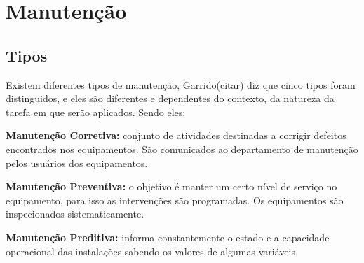 \chapter{Manutenção}
\label{cap-manutencao}

\section{Tipos}

Existem diferentes tipos de manutenção,  Garrido(citar) diz que  cinco tipos foram distinguidos, e eles são diferentes e dependentes do contexto, da natureza da tarefa em que serão aplicados. Sendo eles: 

\begin{enumarate}
	\item \textbf{Manutenção Corretiva:} conjunto de atividades destinadas a corrigir defeitos encontrados nos equipamentos. São comunicados ao departamento de manutenção pelos usuários dos equipamentos.
	\item \textbf{Manutenção Preventiva:} o objetivo é manter um certo nível de serviço no equipamento, para isso as intervenções são programadas. Os equipamentos são inspecionados sistematicamente.
	\item \textbf{Manutenção Preditiva:} informa constantemente o estado e a capacidade operacional das instalações sabendo os valores de algumas variáveis.    

%


\end{enumarate}
